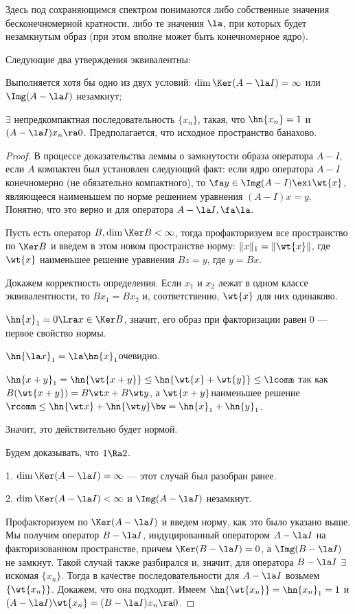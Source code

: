 \documentclass[a4paper]{article}
\begin{document}
Здесь под сохраняющимся спектром понимаются либо собственные значения бесконечномерной кратности,
либо те значения $\la$, при которых будет незамкнутым образ (при этом вполне может быть конечномерное ядро).

\begin{lemma}
Следующие два утверждения эквивалентны:
\begin{nums}{-2}
\item Выполняется хотя бы одно из двух условий:
$\dim\Ker(A-\la I)=\infty$ или $\Img (A-\la I)$ незамкнут;
\item $\exi$ непредкомпактная последовательность $\{x_n\}$, такая, что $\hn{x_n}=1$ и $(A-\la I)x_n\ra 0$.
Предполагается, что исходное пространство банахово.
\end{nums}
\end{lemma}
\begin{proof}
В процессе доказательства леммы о замкнутости образа оператора $A-I$, если $A$ компактен был установлен
следующий факт: если ядро оператора $A-I$ конечномерно (не обязательно компактного), то
$\fa y \in \Img (A-I) \exi \wt{x}$, являющееся наименьшем по норме решением
уравнения $(A-I)x=y$. Понятно, что это верно и для оператора $A-\la I, \fa \la$.

Пусть есть оператор $B,\dim\Ker B<\infty$, тогда профакторизуем все пространство по $\Ker B$ и
введем в этом новом пространстве норму: $\|x\|_1=\|\wt{x}\|$, где $\wt{x}$\т
наименьшее решение уравнения $Bz=y$, где $y=Bx$.

Докажем корректность определения. Если $x_1$ и $x_2$ лежат в одном классе эквивалентности, то
$Bx_1=Bx_2$ и, соответственно, $\wt{x}$ для них одинаково.

$\hn{x}_1=0 \Lra x \in \Ker B$, значит, его образ при факторизации равен $0$ --- первое свойство нормы.

$\hn{\la x}_1=\la \hn{x}_1$\т очевидно.

$\hn{x+y}_1=\hn{\wt{x+y}} \le \hn{\wt{x}+\wt{y}} \le \lcomm$ так как $B(\wt{x+y})=B\wt x +B\wt y $, а
$\wt{x+y}$\т наименьшее решение $\rcomm \le \hn{\wt x}+\hn{\wt y} \bw= \hn{x}_1+\hn{y}_1$.

Значит, это действительно будет нормой.

Будем доказывать, что $1\Ra2$.

1. $\dim \Ker(A-\la I)=\infty$ --- этот случай был разобран ранее.

2. $\dim \Ker(A-\la I)<\infty$ и $\Img(A-\la I)$ незамкнут.

Профакторизуем по $\Ker(A-\la I)$ и введем норму, как это было указано выше.  Мы получим оператор
$B-\la I$, индуцированный оператором $A-\la I$ на факторизованном пространстве, причем $\Ker
(B-\la I)=0$, а $\Img(B-\la I)$ не замкнут. Такой случай также разбирался и, значит, для оператора
$B-\la I$ $\exi$ искомая $\{x_n\}$. Тогда в качестве последовательности для $A-\la I$ возьмем
$\{\wt{x_n}\}$. Докажем, что она подходит. Имеем $\hn{\wt{x_n}}=\hn{x_n}_1=1$ и $(A-\la
I)\wt{x_n}=(B-\la I)x_n \ra 0$.


\end{proof}
\end{document}
